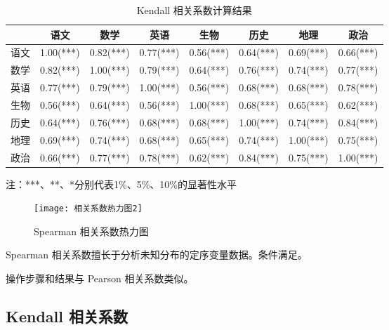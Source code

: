 \documentclass[withoutpreface]{cumcmthesis}
\begin{document}
\begin{table}[H]
    \centering
    \caption{Kendall 相关系数计算结果}\label{Tab:6}
    \begin{tabular}{|c|c|c|c|c|c|c|c|}
        \hline
           & 语文        & 数学        & 英语        & 生物        & 历史        & 地理        & 政治        \\
        \hline
        语文 & 1.00(***) & 0.82(***) & 0.77(***) & 0.56(***) & 0.64(***) & 0.69(***) & 0.66(***) \\
        \hline
        数学 & 0.82(***) & 1.00(***) & 0.79(***) & 0.64(***) & 0.76(***) & 0.74(***) & 0.77(***) \\
        \hline
        英语 & 0.77(***) & 0.79(***) & 1.00(***) & 0.56(***) & 0.68(***) & 0.68(***) & 0.78(***) \\
        \hline
        生物 & 0.56(***) & 0.64(***) & 0.56(***) & 1.00(***) & 0.68(***) & 0.65(***) & 0.62(***) \\
        \hline
        历史 & 0.64(***) & 0.76(***) & 0.68(***) & 0.68(***) & 1.00(***) & 0.74(***) & 0.84(***) \\
        \hline
        地理 & 0.69(***) & 0.74(***) & 0.68(***) & 0.65(***) & 0.74(***) & 1.00(***) & 0.75(***) \\
        \hline
        政治 & 0.66(***) & 0.77(***) & 0.78(***) & 0.62(***) & 0.84(***) & 0.75(***) & 1.00(***) \\
        \hline
    \end{tabular}

    \vspace{0.3cm}
    {注：***、**、*分别代表1\%、5\%、10\%的显著性水平}
\end{table}

\begin{figure}[H]
    \centering
    \texttt{[image: 相关系数热力图2]}
    \caption{Spearman 相关系数热力图}
\end{figure}

Spearman 相关系数擅长于分析未知分布的定序变量数据。条件满足。

操作步骤和结果与 Pearson 相关系数类似。

\subsection{Kendall 相关系数}
\end{document}
